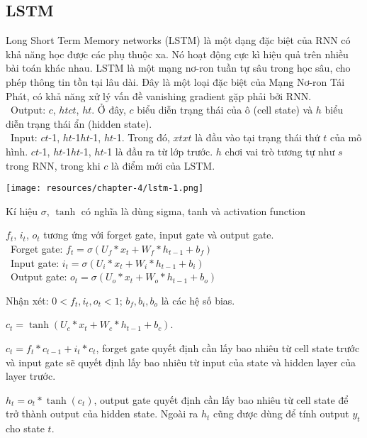 \subsection{LSTM}
Long Short Term Memory networks (LSTM) là một dạng đặc biệt của RNN có khả năng học được các phụ thuộc xa. Nó hoạt động cực kì hiệu quả trên nhiều bài toán khác nhau. LSTM là một mạng nơ-ron tuần tự sâu trong học sâu, cho phép thông tin tồn tại lâu dài. Đây là một loại đặc biệt của Mạng Nơ-ron Tái Phát, có khả năng xử lý vấn đề vanishing gradient gặp phải bởi RNN.\\
    \indent\textbullet\ Output: \(c\), \(htct\), \(ht\). Ở đây, \(c\) biểu diễn trạng thái của ô (cell state) và \(h\) biểu diễn trạng thái ẩn (hidden state).\\
    \indent\textbullet\ Input: \(ct\)-1, \(ht\)-1\(ht\)-1, \(ht\)-1. Trong đó, \(xtxt\) là đầu vào tại trạng thái thứ \(t\) của mô hình. \(ct\)-1, \(ht\)-1\(ht\)-1, \(ht\)-1 là đầu ra từ lớp trước. \(h\) chơi vai trò tương tự như \(s\) trong RNN, trong khi \(c\) là điểm mới của LSTM.

\begin{minipage}{0.35\textwidth}
\centering
\texttt{[image: resources/chapter-4/lstm-1.png]}
\end{minipage}

Kí hiệu \(\sigma\), \(\tanh\) có nghĩa là dùng sigma, tanh và activation function
\par
\( f_t \), \( i_t \), \( o_t \) tương ứng với forget gate, input gate và output gate.\\
    \indent\textbullet\ Forget gate: \( f_t = \sigma\left(U_f \ast x_t + W_f \ast h_{t-1} + b_f\right) \)\\
    \indent\textbullet\ Input gate: \( i_t = \sigma\left(U_i \ast x_t + W_i \ast h_{t-1} + b_i\right) \)\\
    \indent\textbullet\ Output gate: \( o_t = \sigma\left(U_o \ast x_t + W_o \ast h_{t-1} + b_o\right) \)
\par
Nhận xét: \( 0 < f_t, i_t, o_t < 1 \); \( b_f, b_i, b_o \) là các hệ số bias.
\par
\( c_t = \tanh\left(U_c \ast x_t + W_c \ast h_{t-1} + b_c\right) \).
\par
\( c_t = f_t \ast c_{t-1} + i_t \ast c_t \), forget gate quyết định cần lấy bao nhiêu từ cell state trước và input gate sẽ quyết định lấy bao nhiêu từ input của state và hidden layer của layer trước.
\par
\( h_t = o_t \ast \tanh\left(c_t\right) \), output gate quyết định cần lấy bao nhiêu từ cell state để trở thành output của hidden state. Ngoài ra \( h_t \) cũng được dùng để tính output \( y_t \) cho state \( t \).


